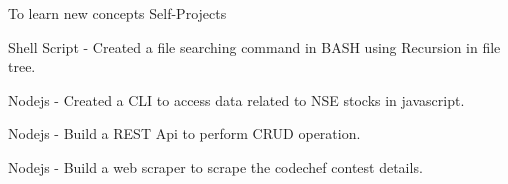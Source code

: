 \begin{cventries}
  \cventry
  {To learn new concepts}
  {Self-Projects}
  {}
  {}
  {
    \begin{cvitems}
      \item Shell Script - Created a file searching command in BASH using Recursion in file tree.
      \item Nodejs - Created a CLI to access data related to NSE stocks in javascript.
      \item Nodejs - Build a REST Api to perform CRUD operation.
      \item Nodejs - Build a web scraper to scrape the codechef contest details.   
    \end{cvitems}
  }
\end{cventries}

